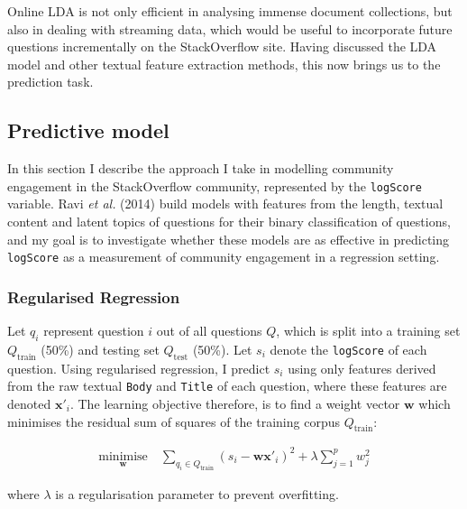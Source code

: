 \documentclass[11pt,preprint, authoryear]{article}
\begin{document}

Online LDA is not only efficient in analysing immense document
collections, but also in dealing with streaming data, which would be
useful to incorporate future questions incrementally on the
StackOverflow site. Having discussed the LDA model and other textual
feature extraction methods, this now brings us to the prediction task.

\newpage

\subsection{\texorpdfstring{Predictive model
\label{Model}}{Predictive model }}\label{predictive-model}

In this section I describe the approach I take in modelling community
engagement in the StackOverflow community, represented by the
\texttt{logScore} variable. Ravi \emph{et al.} (2014) build models with
features from the length, textual content and latent topics of questions
for their binary classification of questions, and my goal is to
investigate whether these models are as effective in predicting
\texttt{logScore} as a measurement of community engagement in a
regression setting.

\subsubsection{Regularised Regression}\label{regularised-regression}

Let \(q_i\) represent question \(i\) out of all questions \(Q\), which
is split into a training set \(Q_\text{train}\) (50\%) and testing set
\(Q_\text{test}\) (50\%). Let \(s_i\) denote the \texttt{logScore} of
each question. Using regularised regression, I predict \(s_i\) using
only features derived from the raw textual \texttt{Body} and
\texttt{Title} of each question, where these features are denoted
\(\bm{x'}_i\). The learning objective therefore, is to find a weight
vector \(\bm{w}\) which minimises the residual sum of squares of the
training corpus \(Q_\text{train}\):

\begin{align} \label{eq:learn_obj}
\underset{\bm{w}}{\text{minimise}} \quad \sum_{ q_{i} \in Q_{\text{train}} } ( s_i - {\bm{w}\bm{x'}_i} )^2  + \lambda \sum_{j=1}^p w_j^2 
\end{align}

where \(\lambda\) is a regularisation parameter to prevent overfitting.
\end{document}
